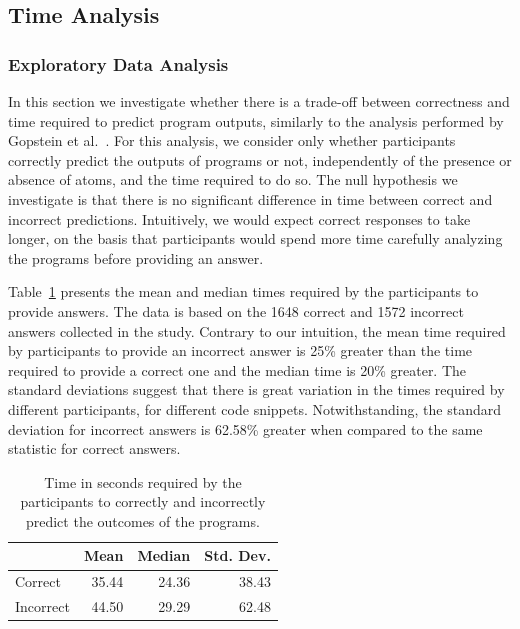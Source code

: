 \subsection{Time Analysis}\label{sec:repeated:time}

\subsubsection*{Exploratory Data Analysis}

In this section we investigate whether there is a trade-off between correctness and time required to predict program outputs, similarly to the analysis performed by Gopstein et al.~\cite{DBLP:conf/sigsoft/GopsteinIYDZYC17}. For this analysis, we consider only whether participants correctly predict the outputs of programs or not, independently of the presence or absence of atoms, and the time required to do so. The null hypothesis we investigate is that there is no significant difference in time between correct and incorrect predictions. Intuitively, we would expect correct responses to take longer, on the basis that participants would spend more time carefully analyzing the programs before providing an answer. 

Table~\ref{tab:repeated:time} presents the mean and median times required by the participants to provide answers. The data is based on the 1648 correct and 1572 incorrect answers collected in the study. Contrary to our intuition, the mean time required by participants to provide an incorrect answer is 25\% greater than the time required to provide a correct one and the median time is 20\% greater. The standard deviations suggest that there is great variation in the times required by different participants, for different code snippets. Notwithstanding, the standard deviation for incorrect answers is 62.58\% greater when compared to the same statistic for correct answers. 

\begin{table}[tb]
  \caption{Time in seconds required by the participants to correctly and incorrectly predict the outcomes of the programs.}\label{tab:repeated:time}
  \centering
  {\scriptsize 
  \begin{tabular}{lrrr}
    \toprule  
             & Mean  & Median & Std. Dev. \\
    \midrule
  Correct   & 35.44 & 24.36  & 38.43     \\
  Incorrect & 44.50 & 29.29  & 62.48    \\
  \bottomrule
  \end{tabular}
}
  \end{table}


